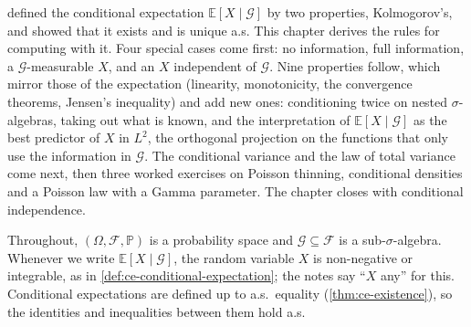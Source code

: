 
 defined the conditional expectation $\mathbb E[X\mid\mathcal G]$
by two properties, Kolmogorov's, and showed that it exists and is unique a.s. This chapter derives
the rules for computing with it. Four special cases come first: no information, full information,
a $\mathcal G$-measurable $X$, and an $X$ independent of $\mathcal G$. Nine properties follow, which
mirror those of the expectation (linearity, monotonicity, the convergence theorems, Jensen's
inequality) and add new ones: conditioning twice on nested $\sigma$-algebras, taking out what is
known, and the interpretation of $\mathbb E[X\mid\mathcal G]$ as the best predictor of $X$ in
$L^2$, the orthogonal projection on the functions that only use the information in $\mathcal G$.
The conditional variance and the law of total variance come next, then three worked exercises
on Poisson thinning, conditional densities and a Poisson law with a Gamma parameter. The chapter
closes with conditional independence.

Throughout, $(\Omega,\mathcal F,\mathbb P)$ is a probability space and $\mathcal G\subseteq\mathcal F$
is a sub-$\sigma$-algebra. Whenever we write $\mathbb E[X\mid\mathcal G]$, the random variable $X$
is non-negative or integrable, as in \cref{def:ce-conditional-expectation}; the notes say ``$X$
any'' for this. Conditional expectations are defined up to a.s.\ equality (\cref{thm:ce-existence}),
so the identities and inequalities between them hold a.s.

